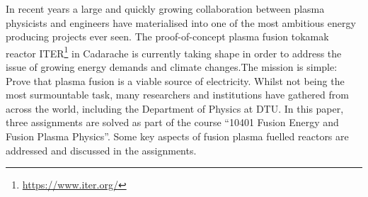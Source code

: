 In recent years a large and quickly growing collaboration between plasma physicists and engineers have materialised into one of the most ambitious energy producing projects ever seen. The proof-of-concept plasma fusion tokamak reactor ITER\footnote{\url{https://www.iter.org/}} in Cadarache is currently taking shape in order to address the issue of growing energy demands and climate changes.\newline The mission is simple: Prove that plasma fusion is a viable source of electricity.\newline
Whilst not being the most surmountable task, many researchers and institutions have gathered from across the world, including the Department of Physics at DTU.\newline
In this paper, three assignments are solved as part of the course ``10401 Fusion Energy and Fusion Plasma Physics''. Some key aspects of fusion plasma fuelled reactors are addressed and discussed in the assignments.
